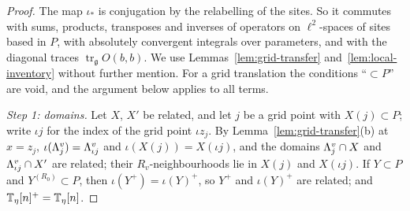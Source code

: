 \begin{proof}
The map $\iota_*$ is conjugation by the relabelling of the sites. So it commutes with sums, products, transposes and inverses of operators on $\ell^2$-spaces of sites based in $P$, with absolutely convergent integrals over parameters, and with the diagonal traces $\operatorname{tr}_{\mathfrak g}O(b,b)$. We use Lemmas~\ref{lem:grid-transfer} and~\ref{lem:local-inventory} without further mention. For a grid translation the conditions ``$\subset P$'' are void, and the argument below applies to all terms.

\emph{Step 1: domains.} Let $X$, $X'$ be related, and let $j$ be a grid point with $X(j)\subset P$; write $\iota j$ for the index of the grid point $\iota z_j$. By Lemma~\ref{lem:grid-transfer}(b) at $x=z_j$, $\iota(\Lambda^v_j)=\Lambda^v_{\iota j}$ and $\iota(X(j))=X(\iota j)$, and the domains $\Lambda^v_j\cap X$ and $\Lambda^v_{\iota j}\cap X'$ are related; their $R_v$-neighbourhoods lie in $X(j)$ and $X(\iota j)$. If $Y\subset P$ and $Y^{(R_0)}\subset P$, then $\iota(Y^+)=\iota(Y)^+$, so $Y^+$ and $\iota(Y)^+$ are related; and $\mathbb T_\eta[n]^+=\mathbb T_\eta[n]$.


\end{proof}
